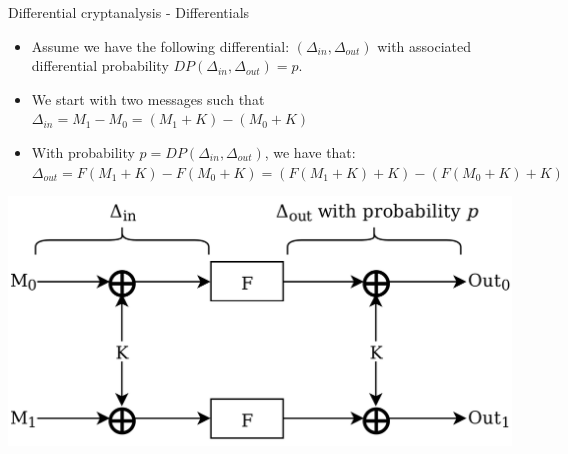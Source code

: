\documentclass{beamer}
\begin{document}
\begin{frame}{Differential cryptanalysis - Differentials}
\begin{itemize}
    \item Assume we have the following differential: $(\Delta_{in}, \Delta_{out})$ with associated differential probability $DP(\Delta_{in}, \Delta_{out}) = p$.
    \item We start with two messages such that $\Delta_{in} = M_1 - M_0 = (M_1 + K) - (M_0 + K)$
    \item With probability $p = DP(\Delta_{in}, \Delta_{out})$, we have that: $\Delta_{out} = F(M_1 + K) - F(M_0 + K) = (F(M_1 + K) + K) - (F(M_0 + K) + K)$
\end{itemize}
\centering\includegraphics[scale=0.101]{Differential_Example.png}
\end{frame}
\end{document}
